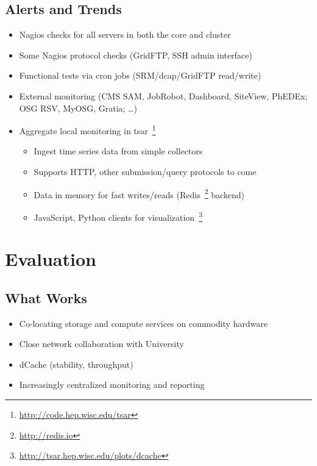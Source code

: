 \documentclass{beamer}
\begin{document}
\subsection{Alerts and Trends} %
\begin{frame}
\begin{itemize}
	\item Nagios checks for all servers in both the core and cluster
	\item Some Nagios protocol checks (GridFTP, SSH admin interface)
	\item Functional tests via cron jobs (SRM/dcap/GridFTP read/write)
	\item External monitoring (CMS SAM, JobRobot, Dashboard, SiteView, PhEDEx; OSG RSV, MyOSG, Gratia; \ldots{})
	\item Aggregate local monitoring in tsar~\footnote{\url{http://code.hep.wisc.edu/tsar}}
	\begin{itemize}
		\item Ingest time series data from simple collectors
		\item Supports HTTP, other submission/query protocols to come
		\item Data in memory for fast writes/reads (Redis~\footnote{\url{http://redis.io}} backend)
		\item JavaScript, Python clients for visualization~\footnote{\url{http://tsar.hep.wisc.edu/plots/dcache}}
	\end{itemize}
\end{itemize}
\end{frame}

\section{Evaluation}
\subsection{What Works}
\begin{frame}
\begin{itemize}
	\item Co-locating storage and compute services on commodity hardware
	\item Close network collaboration with University
	\item dCache (stability, throughput)
	\item Increasingly centralized monitoring and reporting
\end{itemize}
\end{frame}
\end{document}
